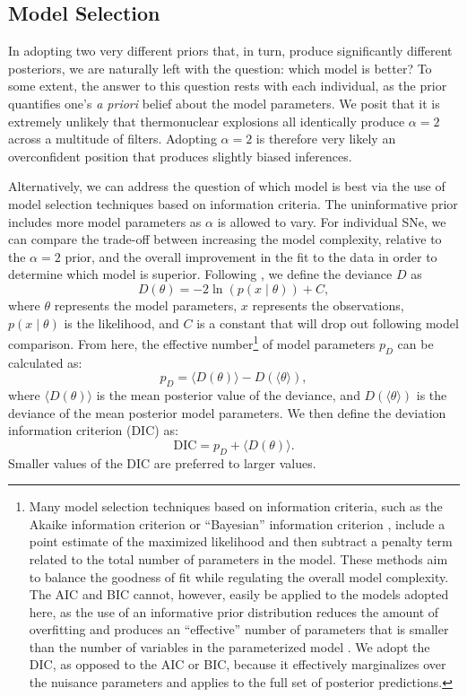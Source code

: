 \documentclass[twocolumn]{./aastex63}
\begin{document}
\subsection{Model Selection}\label{sec:dic}

In adopting two very different priors that, in turn, produce significantly
different posteriors, we are naturally left with the question: which model is
better? To some extent, the answer to this question rests with each
individual, as the prior quantifies one's \textit{a priori} belief about the
model parameters. We posit that it is extremely unlikely that thermonuclear
explosions all identically produce $\alpha = 2$ across a multitude of filters.
Adopting $\alpha = 2$ is therefore very likely an overconfident position that
produces slightly biased inferences.

Alternatively, we can address the question of which model is best via the use
of model selection techniques based on information criteria. The
uninformative prior includes more model parameters as $\alpha$ is allowed to
vary. For individual SNe, we can compare the trade-off between increasing the
model complexity, relative to the $\alpha = 2$ prior, and the overall
improvement in the fit to the data in order to determine which model is
superior. Following \citet{Spiegelhalter02}, we define the deviance $D$ as
%
$$D(\theta) = -2 \ln \left(p(x\mid \theta)\right) + C,$$
%
where $\theta$ represents the model parameters, $x$ represents the
observations, $p(x\mid \theta)$ is the likelihood, and $C$ is a constant that
will drop out following model comparison. From here, the effective
number\footnote{Many model selection techniques based on information criteria,
such as the Akaike information criterion \citep[AIC;][]{Akaike73} or
``Bayesian'' information criterion \citep[BIC;][]{Schwarz78}, include a point
estimate of the maximized likelihood and then subtract a penalty term related
to the total number of parameters in the model. These methods aim to balance
the goodness of fit while regulating the overall model complexity. The AIC and
BIC cannot, however, easily be applied to the models adopted here, as the use
of an informative prior distribution reduces the amount of overfitting and
produces an ``effective'' number of parameters that is smaller than the number
of variables in the parameterized model \citep{Gelman14}. We adopt the DIC, as
opposed to the AIC or BIC, because it effectively marginalizes over the
nuisance parameters and applies to the full set of posterior predictions.} of
model parameters $p_D$ can be calculated as:
%
$$p_D = \langle D(\theta) \rangle - D(\langle \theta \rangle),$$
%
where $\langle D(\theta) \rangle$ is the mean posterior value of the deviance,
and $D(\langle \theta \rangle)$ is the deviance of the mean posterior model
parameters. We then define the deviation information criterion (DIC) as:
%
$$\mathrm{DIC} = p_D + \langle D(\theta) \rangle.$$
% 
Smaller values of  the DIC are  preferred to larger values.
\end{document}
